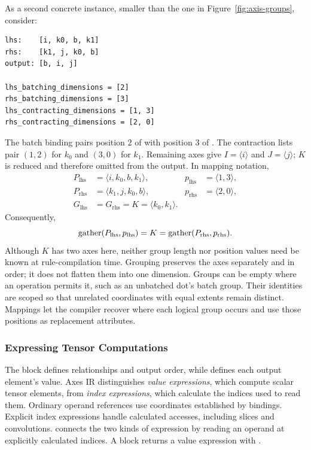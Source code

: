 As a second concrete instance, smaller than the one in
Figure~\ref{fig:axis-groups}, consider:
\begin{codeblock}[H]
\begin{lstlisting}
lhs:    [i, k0, b, k1]
rhs:    [k1, j, k0, b]
output: [b, i, j]

lhs_batching_dimensions = [2]
rhs_batching_dimensions = [3]
lhs_contracting_dimensions = [1, 3]
rhs_contracting_dimensions = [2, 0]
\end{lstlisting}
\end{codeblock}
The batch binding pairs position $2$ of  with position $3$ of
. The contraction lists pair $(1,2)$ for $k_0$ and $(3,0)$ for
$k_1$. Remaining axes give $I=\langle i\rangle$ and $J=\langle j\rangle$;
$K$ is reduced and therefore omitted from the output. In mapping notation,
\begin{equation}
\begin{aligned}
P_{\mathrm{lhs}}&=\langle i,k_0,b,k_1\rangle,
 &p_{\mathrm{lhs}}&=\langle1,3\rangle,\\
P_{\mathrm{rhs}}&=\langle k_1,j,k_0,b\rangle,
 &p_{\mathrm{rhs}}&=\langle2,0\rangle,\\
G_{\mathrm{lhs}}&=G_{\mathrm{rhs}}=K=\langle k_0,k_1\rangle.
\end{aligned}
\end{equation}
Consequently,
\begin{equation}
 \operatorname{gather}(P_{\mathrm{lhs}},p_{\mathrm{lhs}})
 =K=\operatorname{gather}(P_{\mathrm{rhs}},p_{\mathrm{rhs}}).
\end{equation}
Although $K$ has two axes here, neither group length nor position values need
be known at rule-compilation time. Grouping preserves the axes separately and
in order; it does not flatten them into one dimension. Groups can be empty
where an operation permits it, such as an unbatched dot's batch group. Their
identities are scoped so that unrelated coordinates with equal extents remain
distinct. Mappings let the compiler recover where each logical group occurs
and use those positions as replacement attributes.

\FloatBarrier
\subsubsection{Expressing Tensor Computations}
\label{sec:value-expressions}
The  block defines relationships and output order, while
 defines each output element's value. Axes IR distinguishes
\emph{value expressions}, which compute scalar tensor elements, from
\emph{index expressions}, which calculate the indices used to read them.
Ordinary operand references use coordinates established by bindings. Explicit
index expressions handle calculated accesses, including slices and
convolutions.  connects the two kinds of expression by reading an
operand at explicitly calculated indices. A  block returns a
value expression with .

